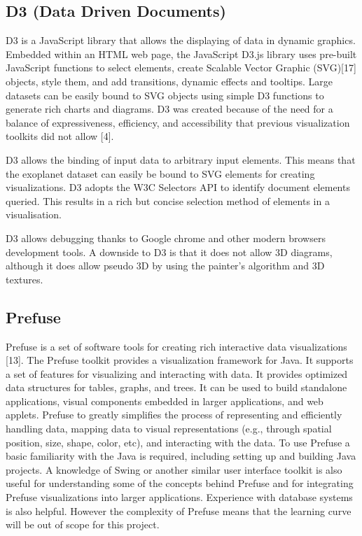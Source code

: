 \subsection{D3 (Data Driven Documents)}
D3 is a JavaScript library that allows the displaying of data in dynamic graphics. Embedded
within an HTML web page, the JavaScript D3.js library uses pre-built JavaScript functions to
select elements, create Scalable Vector Graphic (SVG)[17] objects, style them, and add transitions,
dynamic effects and tooltips. Large datasets can be easily bound to SVG objects using
simple D3 functions to generate rich charts and diagrams. D3 was created because of the
need for a balance of expressiveness, efficiency, and accessibility that previous visualization
toolkits did not allow [4].

D3 allows the binding of input data to arbitrary input elements. This means that the exoplanet
dataset can easily be bound to SVG elements for creating visualizations. D3 adopts
the W3C Selectors API to identify document elements queried. This results in a rich but
concise selection method of elements in a visualisation.

D3 allows debugging thanks to Google chrome and other modern browsers development
tools. A downside to D3 is that it does not allow 3D diagrams, although it does allow
pseudo 3D by using the painter’s algorithm and 3D textures.

\subsection{Prefuse}
Prefuse is a set of software tools for creating rich interactive data visualizations [13]. The
Prefuse toolkit provides a visualization framework for Java. It supports a set of features
for visualizing and interacting with data. It provides optimized data structures for tables,
graphs, and trees. It can be used to build standalone applications, visual components embedded
in larger applications, and web applets. Prefuse to greatly simplifies the process
of representing and efficiently handling data, mapping data to visual representations (e.g.,
through spatial position, size, shape, color, etc), and interacting with the data.
To use Prefuse a basic familiarity with the Java is required, including setting up and building
Java projects. A knowledge of Swing or another similar user interface toolkit is also
useful for understanding some of the concepts behind Prefuse and for integrating Prefuse
visualizations into larger applications. Experience with database systems is also helpful. 
However the complexity of Prefuse means that the learning curve will be out of scope for
this project.

